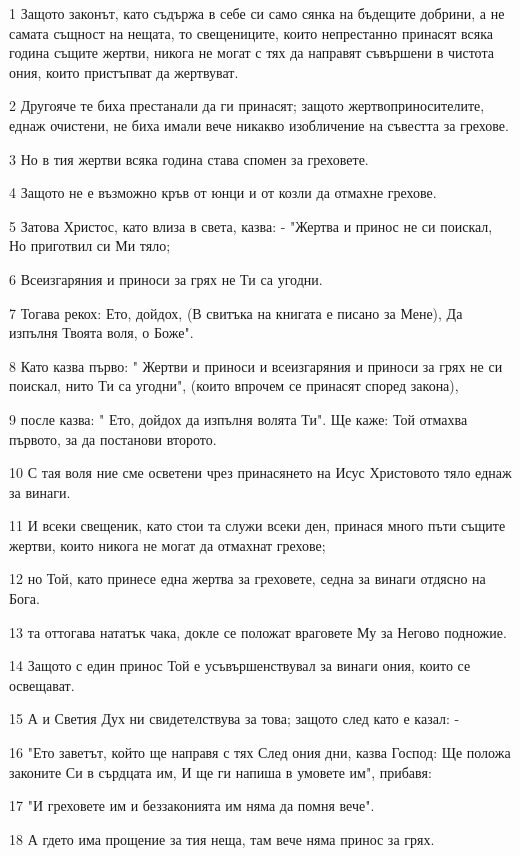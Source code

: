 \par 1 Защото законът, като съдържа в себе си само сянка на бъдещите добрини, а не самата същност на нещата, то свещениците, които непрестанно принасят всяка година същите жертви, никога не могат с тях да направят съвършени в чистота ония, които пристъпват да жертвуват.
\par 2 Другояче те биха престанали да ги принасят; защото жертвоприносителите, еднаж очистени, не биха имали вече никакво изобличение на съвестта за грехове.
\par 3 Но в тия жертви всяка година става спомен за греховете.
\par 4 Защото не е възможно кръв от юнци и от козли да отмахне грехове.
\par 5 Затова Христос, като влиза в света, казва: - "Жертва и принос не си поискал, Но приготвил си Ми тяло;
\par 6 Всеизгаряния и приноси за грях не Ти са угодни.
\par 7 Тогава рекох: Ето, дойдох, (В свитъка на книгата е писано за Мене), Да изпълня Твоята воля, о Боже".
\par 8 Като казва първо: " Жертви и приноси и всеизгаряния и приноси за грях не си поискал, нито Ти са угодни", (които впрочем се принасят според закона),
\par 9 после казва: " Ето, дойдох да изпълня волята Ти". Ще каже: Той отмахва първото, за да постанови второто.
\par 10 С тая воля ние сме осветени чрез принасянето на Исус Христовото тяло еднаж за винаги.
\par 11 И всеки свещеник, като стои та служи всеки ден, принася много пъти същите жертви, които никога не могат да отмахнат грехове;
\par 12 но Той, като принесе една жертва за греховете, седна за винаги отдясно на Бога.
\par 13 та оттогава нататък чака, докле се положат враговете Му за Негово подножие.
\par 14 Защото с един принос Той е усъвършенствувал за винаги ония, които се освещават.
\par 15 А и Светия Дух ни свидетелствува за това; защото след като е казал: -
\par 16 "Ето заветът, който ще направя с тях След ония дни, казва Господ: Ще положа законите Си в сърдцата им, И ще ги напиша в умовете им", прибавя:
\par 17 "И греховете им и беззаконията им няма да помня вече".
\par 18 А гдето има прощение за тия неща, там вече няма принос за грях.
